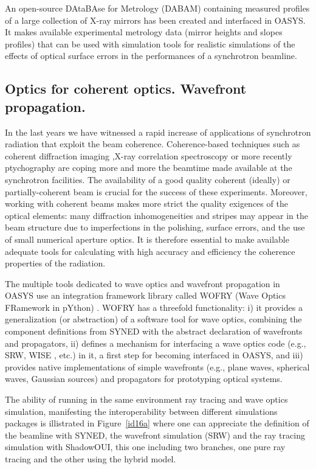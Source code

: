 \documentclass{aip-cp}
\begin{document}
An open-source DAtaBAse for Metrology (DABAM) \cite{dabam} containing measured profiles of a large collection of X-ray mirrors has been created and interfaced in OASYS. It makes available experimental metrology data (mirror heights and slopes profiles) that can be used with simulation tools for realistic simulations of the effects of optical surface errors in the performances of a synchrotron beamline.


\subsection{Optics for coherent optics. Wavefront propagation.}

In the last years we have witnessed a rapid increase of applications of synchrotron radiation that exploit the beam coherence. Coherence-based techniques such as coherent diffraction imaging ,X-ray correlation spectroscopy or more recently ptychography are coping more and more the beamtime made available at the synchrotron facilities. The availability of a good quality coherent (ideally) or partially-coherent beam is crucial for the success of these experiments. Moreover, working with coherent beams makes more strict the quality exigences of the optical elements: many diffraction inhomogeneities and stripes may appear in the beam structure due to imperfections in the polishing, surface errors, and the use of small numerical aperture optics. It is therefore essential to make available adequate tools for calculating with high accuracy and efficiency the coherence properties of the radiation. 

The multiple tools dedicated to wave optics and wavefront propagation in OASYS use an integration framework library called WOFRY (Wave Optics FRamework in pYthon) \cite{oasys2}. WOFRY has a threefold functionality: i) it provides a generalization (or abstraction) of a software tool for wave optics, combining the component definitions from SYNED with the abstract declaration of wavefronts and propagators, ii) defines a mechanism for interfacing a wave optics code (e.g., SRW, WISE \cite{wise}, etc.) in it, a first step for becoming interfaced in OASYS, and iii) provides native implementations of simple wavefronts (e.g., plane waves, spherical waves, Gaussian sources) and propagators for prototyping optical systems.

The ability of running in the same environment ray tracing and wave optics simulation, manifesting the interoperability between different simulations packages is illistrated in Figure~\ref{id16a} where one can appreciate the definition of the beamline with SYNED, the wavefront simulation (SRW) and the ray tracing simulation with ShadowOUI, this one including two branches, one pure ray tracing and the other using the hybrid model. 
\end{document}
